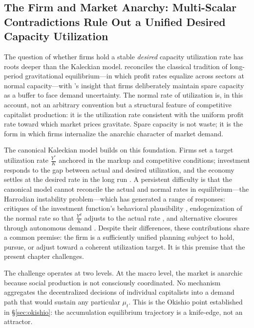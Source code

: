 \documentclass[11pt,a4paper]{article}
\begin{document}
\subsection{The Firm and Market Anarchy: Multi-Scalar Contradictions Rule Out a Unified Desired Capacity Utilization}
\label{sec:firm_anarchy}

The question of whether firms hold a stable \textit{desired} capacity utilization rate has roots deeper than the Kaleckian model. \citet{Ciccone1986} reconciles the classical tradition of long-period gravitational equilibrium---in which profit rates equalize across sectors at normal capacity---with \citeauthor{Steindl1952}'s \citeyearpar{Steindl1952} insight that firms deliberately maintain spare capacity as a buffer to face demand uncertainty. The normal rate of utilization is, in this account, not an arbitrary convention but a structural feature of competitive capitalist production: it is the utilization rate consistent with the uniform profit rate toward which market prices gravitate. Spare capacity is not waste; it is the form in which firms internalize the anarchic character of market demand.

The canonical Kaleckian model builds on this foundation. Firms set a target utilization rate $\frac{Y^*}{K}$ anchored in the markup and competitive conditions; investment responds to the gap between actual and desired utilization, and the economy settles at the desired rate in the long run \citep{Kalecki1971, Steindl1952, Dutt1990, BhaduriMarglin1990}. A persistent difficulty is that the canonical model cannot reconcile the actual and normal rates in equilibrium---the Harrodian instability problem---which has generated a range of responses: critiques of the investment function's behavioral plausibility \citep{Skott2012}, endogenization of the normal rate so that $\frac{Y^d}{K}$ adjusts to the actual rate \citep{Nikiforos2013, Nikiforos2016, Setterfield2020}, and alternative closures through autonomous demand \citep{Serrano1995}. Despite their differences, these contributions share a common premise: the firm is a sufficiently unified planning subject to hold, pursue, or adjust toward a coherent utilization target. It is this premise that the present chapter challenges.

The challenge operates at two levels. At the macro level, the market is anarchic because social production is not consciously coordinated. No mechanism aggregates the decentralized decisions of individual capitalists into a demand path that would sustain any particular $\mu_t$. This is the Okishio point established in \S\ref{sec:okishio}: the accumulation equilibrium trajectory is a knife-edge, not an attractor.
\end{document}
